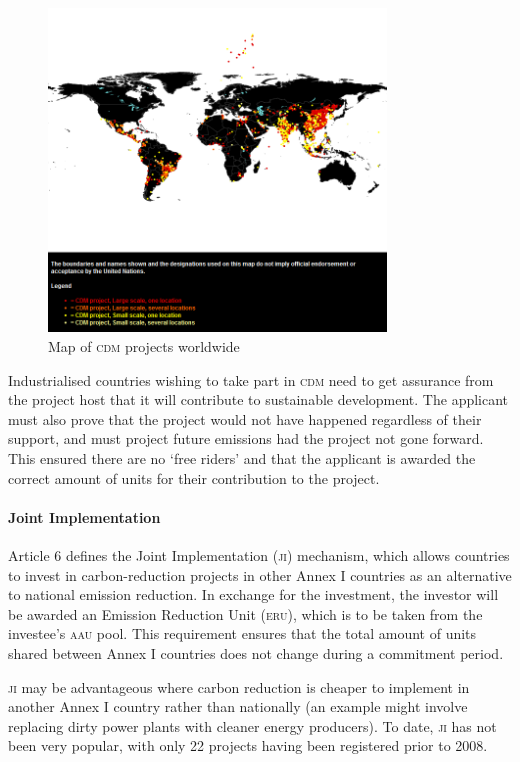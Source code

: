 \begin{figure}[h!]
	\centering
	\includegraphics[width=0.8\textwidth]{img/CDM_Map.png}
	\caption{Map of \textsc{cdm} projects worldwide~\cite{UNFCCC-CDM-map}}
	\label{fig:cdm_map}
\end{figure}

Industrialised countries wishing to take part in \textsc{cdm} need to get assurance from the project host that it will contribute to sustainable development. The applicant must also prove that the project would not have happened regardless of their support, and must project future emissions had the project not gone forward. This ensured there are no `free riders' and that the applicant is awarded the correct amount of units for their contribution to the project.

\paragraph{Joint Implementation}

Article 6 defines the Joint Implementation (\textsc{ji}) mechanism, which allows countries to invest in carbon-reduction projects in other Annex I countries as an alternative to national emission reduction. In exchange for the investment, the investor will be awarded an Emission Reduction Unit (\textsc{eru}), which is to be taken from the investee's \textsc{aau} pool. This requirement ensures that the total amount of units shared between Annex I countries does not change during a commitment period.

\textsc{ji} may be advantageous where carbon reduction is cheaper to implement in another Annex I country rather than nationally (an example might involve replacing dirty power plants with cleaner energy producers). To date, \textsc{ji} has not been very popular, with only 22 projects having been registered prior to 2008. %

